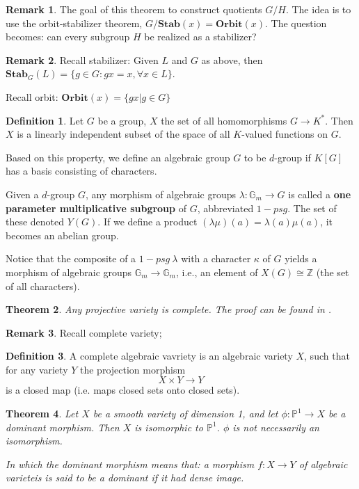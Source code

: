 \documentclass[12pt,a4paper,english]{article}
\theoremstyle{plain}
\newtheorem{thm}{Theorem}[section]
\theoremstyle{definition}
\newtheorem{defi}[thm]{Definition}
\newtheorem*{rem}{Remark}
\begin{document}
\begin{rem}
The goal of this theorem to construct quotients $G/H$. The idea is to use the orbit-stabilizer theorem, $G/\textbf{Stab}(x)=\textbf{Orbit}(x)$. The question becomes: can every subgroup $H$ be realized as a stabilizer?
\end{rem}

\begin{rem}
Recall stabilizer: Given $L$ and $G$ as above, then $\textbf{Stab}_{G}(L)=\{g\in G: gx=x,\forall x\in L\}$.

Recall orbit: $\textbf{Orbit}(x)=\{gx|g\in G\}$
\end{rem}
\begin{defi}
Let $G$ be a group, $X$ the set of all homomorphisms $G\rightarrow K^{*}$. Then $X$ is a linearly independent subset of the space of all $K$-valued functions on $G$.

Based on this property, we define an algebraic group $G$ to be $d$-group if $K[G]$ has a basis consisting of characters. 

Given a $d$-group $G$, any morphism of algebraic groups $\lambda:\mathbb{G}_{m}\rightarrow G$ is called a \textbf{one parameter multiplicative subgroup} of $G$, abbreviated $1-psg$. The set of these denoted $Y(G)$. If we define a product $(\lambda\mu)(a)=\lambda(a)\mu(a)$, it becomes an abelian group. 

Notice that the composite of a $1-psg\ \lambda$ with a character $\kappa$ of $G$ yields a morphism of algebraic groups $\mathbb{G}_{m}\rightarrow\mathbb{G}_{m}$, i.e., an element of $X(G)\cong\mathbb{Z}$ (the set of all characters).
\end{defi}
\begin{thm}
Any projective variety is complete. The proof can be found in \cite{AGMIT}.
\end{thm}
\begin{rem}
Recall complete variety;
\begin{defi}
A complete algebraic vavriety is an algebraic variety $X$, such that for any variety $Y$ the projection morphism
\begin{equation*}
    X\times Y\rightarrow Y
\end{equation*}
is a closed map (i.e. maps closed sets onto closed sets).
\end{defi}
\end{rem}
\begin{thm}
Let $X$ be a smooth variety of dimension 1, and let $\phi:\mathbb{P}^{1}\rightarrow X$ be a dominant morphism. Then $X$ is isomorphic to $\mathbb{P}^{1}$. $\phi
$ is not necessarily an isomorphism. 

In which the dominant morphism means that: a morphism $f:X\rightarrow Y$ of algebraic varieteis is said to be a dominant if it had dense image.
\end{thm}
\end{document}
